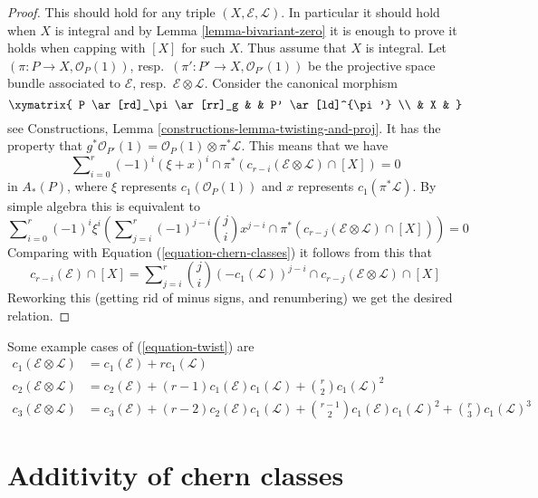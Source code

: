 \begin{proof}
This should hold for any triple $(X, \mathcal{E}, \mathcal{L})$.
In particular it should hold when $X$ is integral and by
Lemma \ref{lemma-bivariant-zero}
it is enough to prove
it holds when capping with $[X]$ for such $X$. Thus assume
that $X$ is integral. Let $(\pi : P \to X, \mathcal{O}_P(1))$,
resp.\ $(\pi' : P' \to X, \mathcal{O}_{P'}(1))$ be the
projective space bundle associated to $\mathcal{E}$,
resp.\ $\mathcal{E} \otimes \mathcal{L}$. Consider the canonical morphism
$$
\xymatrix{
P \ar[rd]_\pi \ar[rr]_g & & P' \ar[ld]^{\pi'} \\
& X &
}
$$
see Constructions, Lemma \ref{constructions-lemma-twisting-and-proj}.
It has the property that
$g^*\mathcal{O}_{P'}(1)
= \mathcal{O}_P(1) \otimes \pi^* {\mathcal L}$.
This means that we have
$$
\sum\nolimits_{i = 0}^r
(-1)^i
(\xi + x)^i \cap \pi^*(c_{r - i}(\mathcal{E} \otimes \mathcal{L}) \cap [X])
=
0
$$
in $A_*(P)$, where $\xi$ represents
$c_1(\mathcal{O}_P(1))$ and $x$
represents $c_1(\pi^*\mathcal{L})$. By simple algebra this
is equivalent to
$$
\sum\nolimits_{i = 0}^r
(-1)^i \xi^i \left(
\sum\nolimits_{j = i}^r
(-1)^{j - i}
\binom{j}{i}
x^{j - i} \cap
\pi^*(c_{r - j}(\mathcal{E} \otimes \mathcal{L}) \cap [X])
\right)
=
0
$$
Comparing with
Equation (\ref{equation-chern-classes}) it follows from this that
$$
c_{r - i}(\mathcal{E}) \cap [X] =
\sum\nolimits_{j = i}^r
\binom{j}{i}
(-c_1(\mathcal{L}))^{j - i} \cap
c_{r - j}(\mathcal{E} \otimes \mathcal{L}) \cap [X]
$$
Reworking this (getting rid of minus signs, and renumbering) we get
the desired relation.
\end{proof}

\noindent
Some example cases of (\ref{equation-twist}) are
\begin{align*}
c_1(\mathcal{E} \otimes \mathcal{L})
& =
c_1(\mathcal{E}) +
r c_1(\mathcal{L}) \\
c_2(\mathcal{E} \otimes \mathcal{L})
& =
c_2(\mathcal{E}) +
(r - 1) c_1(\mathcal{E}) c_1(\mathcal{L}) +
\binom{r}{2} c_1(\mathcal{L})^2 \\
c_3(\mathcal{E} \otimes \mathcal{L})
& =
c_3(\mathcal{E}) +
(r - 2) c_2(\mathcal{E})c_1(\mathcal{L}) +
\binom{r - 1}{2} c_1(\mathcal{E})c_1(\mathcal{L})^2 +
\binom{r}{3} c_1(\mathcal{L})^3
\end{align*}








\section{Additivity of chern classes}
\label{section-additivity-chern-classes}

